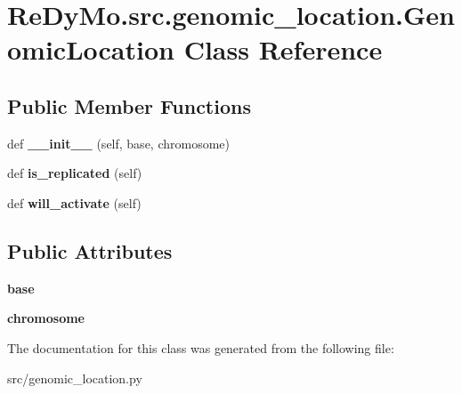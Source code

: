 \hypertarget{classReDyMo_1_1src_1_1genomic__location_1_1GenomicLocation}{}\section{Re\+Dy\+Mo.\+src.\+genomic\+\_\+location.\+Genomic\+Location Class Reference}
\label{classReDyMo_1_1src_1_1genomic__location_1_1GenomicLocation}
\subsection*{Public Member Functions}
\begin{DoxyCompactItemize}
\item 
\mbox{\label{classReDyMo_1_1src_1_1genomic__location_1_1GenomicLocation_ad2fc819130c39efcd02df0b35e6305b3}} 
def {\bfseries \+\_\+\+\_\+init\+\_\+\+\_\+} (self, base, chromosome)
\item 
\mbox{\label{classReDyMo_1_1src_1_1genomic__location_1_1GenomicLocation_a4f524b6f975b0b22af1b82aad57af0b3}} 
def {\bfseries is\+\_\+replicated} (self)
\item 
\mbox{\label{classReDyMo_1_1src_1_1genomic__location_1_1GenomicLocation_a2cabef230d8c2b1278a92e0e4ff24267}} 
def {\bfseries will\+\_\+activate} (self)
\end{DoxyCompactItemize}
\subsection*{Public Attributes}
\begin{DoxyCompactItemize}
\item 
\mbox{\label{classReDyMo_1_1src_1_1genomic__location_1_1GenomicLocation_a96ddb3ccb009bf1267042a2a05da16b6}} 
{\bfseries base}
\item 
\mbox{\label{classReDyMo_1_1src_1_1genomic__location_1_1GenomicLocation_abb84c133360e933e46305c2c48aac776}} 
{\bfseries chromosome}
\end{DoxyCompactItemize}


The documentation for this class was generated from the following file\+:\begin{DoxyCompactItemize}
\item 
src/genomic\+\_\+location.\+py\end{DoxyCompactItemize}
